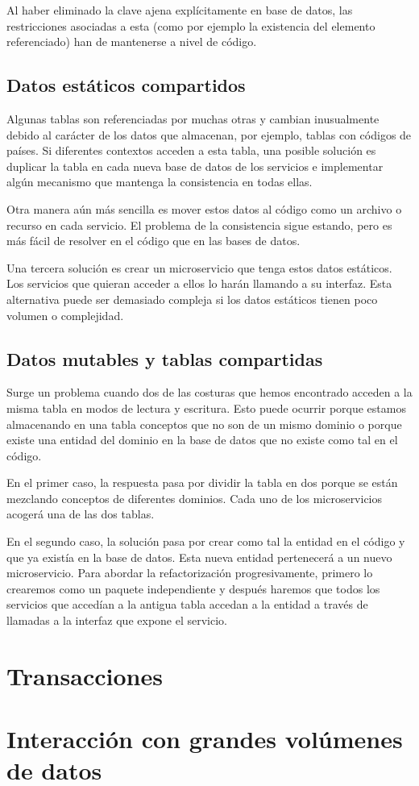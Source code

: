 \documentclass[11pt,a4paper]{article}
\begin{document}
Al haber eliminado la clave ajena explícitamente en base de datos, las restricciones asociadas a esta (como por ejemplo la existencia del elemento referenciado) han de mantenerse a nivel de código.

\subsection{Datos estáticos compartidos}

Algunas tablas son referenciadas por muchas otras y cambian inusualmente debido al carácter de los datos que almacenan, por ejemplo, tablas con códigos de países. Si diferentes contextos acceden a esta tabla, una posible solución es duplicar la tabla en cada nueva base de datos de los servicios e implementar algún mecanismo que mantenga la consistencia en todas ellas.

Otra manera aún más sencilla es mover estos datos al código como un archivo o recurso en cada servicio. El problema de la consistencia sigue estando, pero es más fácil de resolver en el código que en las bases de datos.

Una tercera solución es crear un microservicio que tenga estos datos estáticos. Los servicios que quieran acceder a ellos lo harán llamando a su interfaz. Esta alternativa puede ser demasiado compleja si los datos estáticos tienen poco volumen o complejidad.

\subsection{Datos mutables y tablas compartidas}

Surge un problema cuando dos de las costuras que hemos encontrado acceden a la misma tabla en modos de lectura y escritura. Esto puede ocurrir porque estamos almacenando en una tabla conceptos que no son de un mismo dominio o porque existe una entidad del dominio en la base de datos que no existe como tal en el código.

En el primer caso, la respuesta pasa por dividir la tabla en dos porque se están mezclando conceptos de diferentes dominios. Cada uno de los microservicios acogerá una de las dos tablas.

En el segundo caso, la solución pasa por crear como tal la entidad en el código y que ya existía en la base de datos. Esta nueva entidad pertenecerá a un nuevo microservicio. Para abordar la refactorización progresivamente, primero lo crearemos como un paquete independiente y después haremos que todos los servicios que accedían a la antigua tabla accedan a la entidad a través de llamadas a la interfaz que expone el servicio.

\section{Transacciones}

\section{Interacción con grandes volúmenes de datos}
\end{document}
